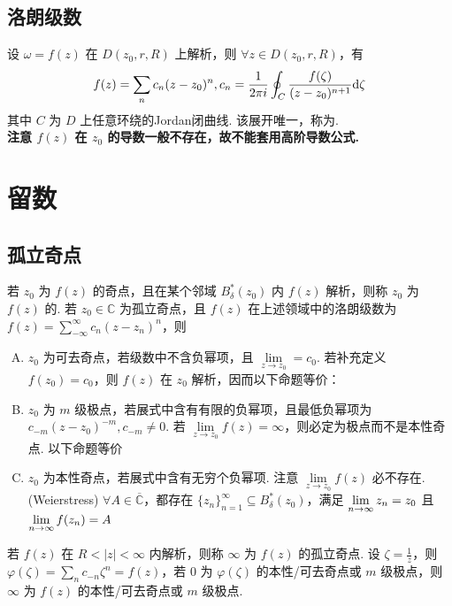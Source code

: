 \documentclass[./main.tex]{subfiles}
\begin{document}
\subsection{洛朗级数}
设 $\omega=f(z)$ 在 $D(z_0,r,R)$ 上解析，则 $\forall z\in D(z_0,r,R)$，有 
\begin{equation}
    f(z)=\sum_nc_n(z-z_0)^n,c_n=\frac{1}{2\pi i}\oint_C\frac{f(\zeta)}{(z-z_0)^{n+1}}\text{d}\zeta
\end{equation}
其中 $C$ 为 $D$ 上任意环绕的Jordan闭曲线. 该展开唯一，称为. \\
\textbf{注意 $f(z)$ 在 $z_0$ 的导数一般不存在，故不能套用高阶导数公式. }
\section{留数}
\subsection{孤立奇点}
若 $z_0$ 为 $f(z)$ 的奇点，且在某个邻域 $B_{\delta}^*(z_0)$ 内 $f(z)$ 解析，则称 $z_0$ 为 $f(z)$ 的. 若 $z_0\in\mathbb{C}$ 为孤立奇点，且 $f(z)$ 在上述领域中的洛朗级数为 $f(z)=\sum_{-\infty}^{\infty}c_n(z-z_n)^n$，则
\begin{enumerate}[(A)]
    \item $z_0$ 为可去奇点，若级数中不含负幂项，且 $\lim\limits_{z\rightarrow z_0}=c_0$. 若补充定义 $f(z_0)=c_0$，则 $f(z)$ 在 $z_0$ 解析，因而以下命题等价：
    \item $z_0$ 为 $m$ 级极点，若展式中含有有限的负幂项，且最低负幂项为 $c_{-m}(z-z_0)^{-m},c_{-m}\neq 0$. 若 $\lim\limits_{z\rightarrow z_0}f(z)=\infty$，则必定为极点而不是本性奇点. 以下命题等价
    \item $z_0$ 为本性奇点，若展式中含有无穷个负幂项. 注意 $\lim\limits_{z\rightarrow z_0}f(z)$ 必不存在. \\
    (Weierstress) $\forall A\in\overline{\mathbb{C}}$，都存在 $\{z_n\}_{n=1}^{\infty}\subseteq B_{\delta}^*(z_0)$，满足 $\lim\limits_{n\rightarrow\infty}z_n=z_0$ 且 $\lim\limits_{n\rightarrow\infty}f(z_n)=A$
\end{enumerate}
若 $f(z)$ 在 $R<|z|<\infty$ 内解析，则称 $\infty$ 为 $f(z)$ 的孤立奇点. 设 $\zeta=\frac{1}{z}$，则 $\varphi(\zeta)=\sum_n c_{-n}\zeta^n=f(z)$，若 $0$ 为 $\varphi(\zeta)$ 的本性/可去奇点或 $m$ 级极点，则 $\infty$ 为 $f(z)$ 的本性/可去奇点或 $m$ 级极点. 
\end{document}
